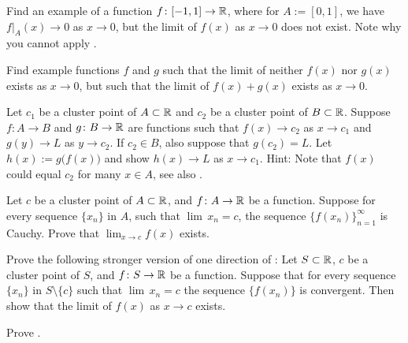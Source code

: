 \begin{exercise}
Find an example of a function $f \colon [-1,1] \to {\mathbb{R}}$, where for
$A:=[0,1]$, we have
$f|_A(x) \to 0$ as $x \to 0$, but the limit of $f(x)$ as $x \to 0$
does not exist.  Note why you cannot apply
.
\end{exercise}

\begin{exercise}
Find example functions $f$ and $g$ such that the limit of neither $f(x)$
nor $g(x)$ exists as $x \to 0$, but such that the limit of $f(x)+g(x)$ exists
as $x \to 0$.
\end{exercise}

\begin{exercise} \label{exercise:contlimitcomposition}
Let $c_1$ be a cluster point of $A \subset {\mathbb{R}}$ and $c_2$ be
a cluster point of $B \subset {\mathbb{R}}$.  Suppose 
$f \colon A \to B$ and $g \colon B \to {\mathbb{R}}$ are functions
such that
$f(x) \to c_2$ as $x \to c_1$ and
$g(y) \to L$ as $y \to c_2$.  If $c_2 \in B$, also suppose that $g(c_2) = L$.  Let $h(x) := g\bigl(f(x)\bigr)$ and show
$h(x) \to L$ as $x \to c_1$.
Hint: Note that $f(x)$ could equal $c_2$ for many $x \in A$,
see also
.
\end{exercise}

\begin{exercise}
Let $c$ be a cluster point of $A \subset {\mathbb{R}}$, and $f \colon A \to {\mathbb{R}}$
be a function.  Suppose for every sequence $\{x_n\}$ in $A$,
such that $\lim\, x_n = c$,
the sequence $\{ f(x_n) \}_{n=1}^\infty$ is Cauchy.  Prove that
$\lim_{x\to c} f(x)$ exists.
\end{exercise}

\begin{exercise} \label{exercise:seqflimitalt}
Prove the following stronger version of one direction of
:
Let $S \subset {\mathbb{R}}$, $c$ be a cluster point of $S$, and $f \colon S \to
{\mathbb{R}}$ be a function.
Suppose that for every sequence $\{x_n\}$ in $S \setminus \{c\}$ such that
$\lim\, x_n = c$ the sequence $\{ f(x_n) \}$ is convergent.
Then show that the limit of $f(x)$ as $x \to c$ exists.
\end{exercise}

\begin{exercise}
Prove .
\end{exercise}

